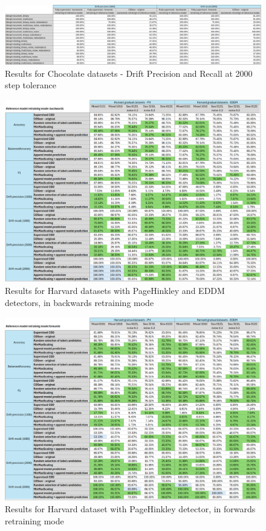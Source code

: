 \documentclass{svproc}
\begin{document}
 \begin{figure}
 	\centering
 	\includegraphics[scale=.95]{figures/Fig31_Chocolate_3.png}
 	\caption{Results for Chocolate datasets - Drift Precision and Recall at 2000 step tolerance}
 	\label{fig:fig31}
 \end{figure}
 
 
 \begin{figure}
 	\centering
 	\includegraphics[scale=1]{figures/Fig32_Harv_1.png}
 	\caption{Results for Harvard datasets with PageHinkley and EDDM detectors, in backwards retraining mode}
 	\label{fig:fig32}
 \end{figure}
 
 
 \begin{figure}
 	\centering
 	\includegraphics[scale=1]{figures/Fig33_Harv_2.png}
 	\caption{Results for Harvard dataset with PageHinkley detector, in forwards retraining mode}
 	\label{fig:fig33}
 \end{figure}
 
\end{document}
